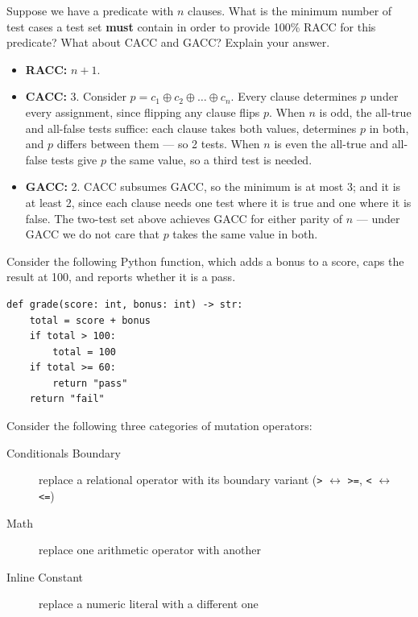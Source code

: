 \documentclass[addpoints, answers]{exam}
\newcommand{\Code}[1]{\texttt{#1}}
\begin{document}
\begin{questions}

\question[3] Suppose we have a predicate with $n$ clauses. What is the
  minimum number of test cases a test set \textbf{must} contain in
  order to provide 100\% RACC for this predicate? What about CACC and
  GACC? Explain your answer. %
  \begin{solution}
    \begin{itemize}
    \item \textbf{RACC:} $n + 1$.
    \item \textbf{CACC:} 3. Consider
      $p = c_1 \oplus c_2 \oplus \ldots \oplus c_n$. Every clause
      determines $p$ under every assignment, since flipping any clause
      flips $p$. When $n$ is odd, the all-true and all-false tests
      suffice: each clause takes both values, determines $p$ in both,
      and $p$ differs between them --- so 2 tests. When $n$ is even
      the all-true and all-false tests give $p$ the same value, so a
      third test is needed.
    \item \textbf{GACC:} 2. CACC subsumes GACC, so the minimum is at
      most 3; and it is at least 2, since each clause needs one test
      where it is true and one where it is false. The two-test set
      above achieves GACC for either parity of $n$ --- under GACC we
      do not care that $p$ takes the same value in both.
    \end{itemize}
  \end{solution}

\newpage


\question Consider the following Python function, which adds a bonus to
  a score, caps the result at 100, and reports whether it is a pass.
  \begin{verbatim}
def grade(score: int, bonus: int) -> str:
    total = score + bonus
    if total > 100:
        total = 100
    if total >= 60:
        return "pass"
    return "fail"
\end{verbatim}

  Consider the following three categories of mutation operators:
  \begin{description}
  \item[Conditionals Boundary] replace a relational operator with its
    boundary variant (\Code{>} $\leftrightarrow$ \Code{>=},
    \Code{<} $\leftrightarrow$ \Code{<=})
  \item[Math] replace one arithmetic operator with another
  \item[Inline Constant] replace a numeric literal with a different one
  \end{description}


\end{questions}
\end{document}
